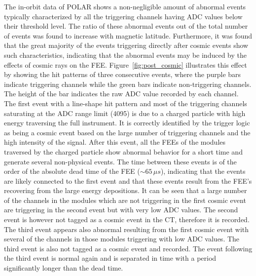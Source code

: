 \documentclass[preprint,sort&compress,12pt]{elsarticle}
\begin{document}
The in-orbit data of POLAR shows a non-negligible amount of abnormal events typically characterized by all the triggering channels having ADC values below their threshold level. The ratio of these abnormal events out of the total number of events was found to increase with magnetic latitude. Furthermore, it was found that the great majority of the events triggering directly after cosmic events show such characteristics, indicating that the abnormal events may be induced by the effects of cosmic rays on the FEE. Figure~\ref{fig:post_cosmic} illustrates this effect by showing the hit patterns of three consecutive events, where the purple bars indicate triggering channels while the green bars indicate non-triggering channels. The height of the bar indicates the raw ADC value recorded by each channel. The first event with a line-shape hit pattern and most of the triggering channels saturating at the ADC range limit (4095) is due to a charged particle with high energy traversing the full instrument. It is correctly identified by the trigger logic as being a cosmic event based on the large number of triggering channels and the high intensity of the signal. After this event, all the FEEs of the modules traversed by the charged particle show abnormal behavior for a short time and generate several non-physical events. The time between these events is of the order of the absolute dead time of the FEE ($\sim 65\,\mu s$), indicating that the events are likely connected to the first event and that these events result from the FEE's recovering from the large energy depositions. It can be seen that a large number of the channels in the modules which are not triggering in the first cosmic event are triggering in the second event but with very low ADC values. The second event is however not tagged as a cosmic event in the CT, therefore it is recorded. The third event appears also abnormal resulting from the first cosmic event with several of the channels in those modules triggering with low ADC values. The third event is also not tagged as a cosmic event and recorded. The event following the third event is normal again and is separated in time with a period significantly longer than the dead time.
\end{document}
